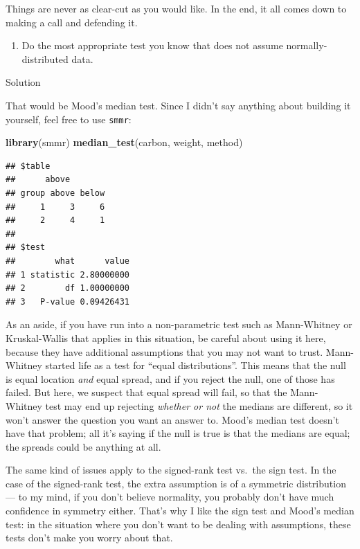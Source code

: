 \documentclass[]{tufte-book}
\newenvironment{Shaded}{}{}
\newcommand{\KeywordTok}[1]{\textcolor[rgb]{0.00,0.44,0.13}{\textbf{#1}}}
\newcommand{\NormalTok}[1]{#1}
\providecommand{\tightlist}{%
  \setlength{\itemsep}{0pt}\setlength{\parskip}{0pt}}
\theoremstyle{definition}
\theoremstyle{definition}
\theoremstyle{definition}
\theoremstyle{remark}
\begin{document}
Things are never as clear-cut as you would like. In the end, it all
comes down to making a call and defending it.

\begin{enumerate}
\def\labelenumi{(\alph{enumi})}
\setcounter{enumi}{6}
\tightlist
\item
  Do the most appropriate test you know that does not assume
  normally-distributed data.
\end{enumerate}

Solution

That would be Mood's median test. Since I didn't say anything about
building it yourself, feel free to use \texttt{smmr}:

\begin{Shaded}
\begin{Highlighting}[]
\KeywordTok{library}\NormalTok{(smmr)}
\KeywordTok{median_test}\NormalTok{(carbon, weight, method)}
\end{Highlighting}
\end{Shaded}

\begin{verbatim}
## $table
##      above
## group above below
##     1     3     6
##     2     4     1
## 
## $test
##        what      value
## 1 statistic 2.80000000
## 2        df 1.00000000
## 3   P-value 0.09426431
\end{verbatim}

As an aside, if you have run into a non-parametric test such as
Mann-Whitney or Kruskal-Wallis that applies in this situation, be
careful about using it here, because they have additional assumptions
that you may not want to trust. Mann-Whitney started life as a test for
``equal distributions''. 
This means that the null is equal location \emph{and} equal spread, and
if you reject the null, one of those has failed. But here, we suspect
that equal spread will fail, so that the Mann-Whitney test may end up
rejecting \emph{whether or not} the medians are different, so it won't
answer the question you want an answer to. Mood's median test doesn't
have that problem; all it's saying if the null is true is that the
medians are equal; the spreads could be anything at all.

The same kind of issues apply to the signed-rank test vs.~the sign test.
In the case of the signed-rank test, the extra assumption is of a
symmetric distribution --- to my mind, if you don't believe normality,
you probably don't have much confidence in symmetry either. That's why I
like the sign test and Mood's median test: in the situation where you
don't want to be dealing with assumptions, these tests don't make you
worry about that.
\end{document}
